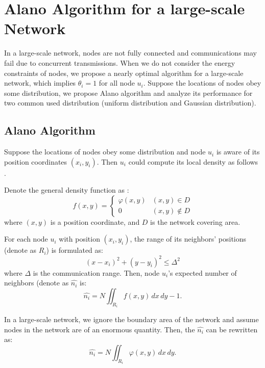 \section{Alano Algorithm for a large-scale Network}
\label{PCN}


In a large-scale network, nodes are not fully connected and communications may fail due to concurrent transmissions. 
When we do not consider the energy constraints of nodes, we propose a nearly optimal algorithm for a large-scale network, which implies $\theta_i = 1$ for all node $u_i$.
Suppose the locations of nodes obey some distribution, we propose Alano algorithm and analyze its performance for two common used distribution (uniform distribution and Gaussian distribution).

\subsection{Alano Algorithm}
Suppose the locations of nodes obey some distribution and node $u_i$ is aware of its position coordinates $(x_i, y_i)$.
Then $u_i$ could compute its local density as follows \cite{meester1996continuum, wang2015connectivity}.

Denote the general density function as :
$$f(x,y)=
\begin{cases}
\varphi(x,y)& (x,y)\in D\\
0& (x,y)\notin D
\end{cases}$$
where $(x,y)$ is a position coordinate, and $D$ is the network covering area.

For each node $u_i$ with position $(x_i,y_i)$, the range of its neighbors' positions (denote as $R_i$) is formulated as:
$$
(x-x_i)^2+(y-y_i)^2 \leq \Delta^2
$$
where $\Delta$ is the communication range. Then, node $u_i$'s expected number of neighbors (denote as $\hat{n_i}$ is:
$$
\hat{n_i} = N\iint_{R_i} f(x,y)\,dx\,dy - 1.
$$

In a large-scale network, we ignore the boundary area of the network and assume nodes in the network are of an enormous quantity. Then, the $\hat{n_i}$ can be rewritten as:
$$
\hat{n_i} = N\iint_{R_i} \varphi(x,y)\,dx\,dy.
$$


